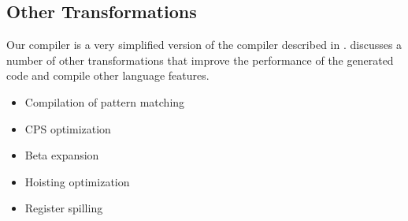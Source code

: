 \subsection{Other Transformations}
Our compiler is a very simplified version of the compiler described in  \autocite{DBLP:books/daglib/0022396}. \citeauthor{DBLP:books/daglib/0022396} discusses a number of other transformations that improve the performance of the generated code and compile other language features.

\begin{itemize}
\item Compilation of pattern matching
\item CPS optimization
\item Beta expansion
\item Hoisting optimization
\item Register spilling
\end{itemize}
